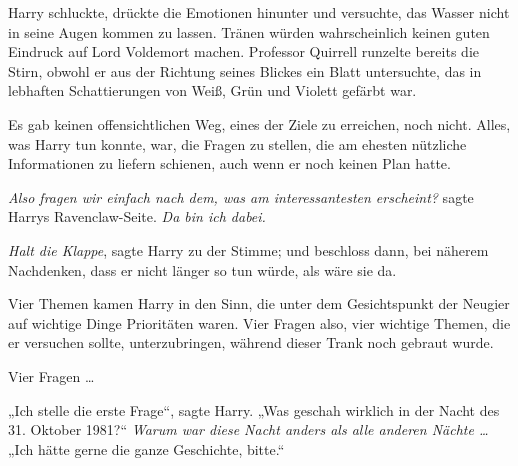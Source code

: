 Harry schluckte, drückte die Emotionen hinunter und versuchte, das Wasser nicht in seine Augen kommen zu lassen. Tränen würden wahrscheinlich keinen guten Eindruck auf Lord Voldemort machen. Professor Quirrell runzelte bereits die Stirn, obwohl er aus der Richtung seines Blickes ein Blatt untersuchte, das in lebhaften Schattierungen von Weiß, Grün und Violett gefärbt war.

Es gab keinen offensichtlichen Weg, eines der Ziele zu erreichen, noch nicht. Alles, was Harry tun konnte, war, die Fragen zu stellen, die am ehesten nützliche Informationen zu liefern schienen, auch wenn er noch keinen Plan hatte.

\emph{Also fragen wir einfach nach dem, was am interessantesten erscheint?} sagte Harrys Ravenclaw-Seite. \emph{Da bin ich dabei.}

\emph{Halt die Klappe}, sagte Harry zu der Stimme; und beschloss dann, bei näherem Nachdenken, dass er nicht länger so tun würde, als wäre sie da.

Vier Themen kamen Harry in den Sinn, die unter dem Gesichtspunkt der Neugier auf wichtige Dinge Prioritäten waren. Vier Fragen also, vier wichtige Themen, die er versuchen sollte, unterzubringen, während dieser Trank noch gebraut wurde.

Vier Fragen …

„Ich stelle die erste Frage“, sagte Harry.
„Was geschah wirklich in der Nacht des 31. Oktober 1981?“
\emph{Warum war diese Nacht anders als alle anderen Nächte …}
„Ich hätte gerne die ganze Geschichte, bitte.“

